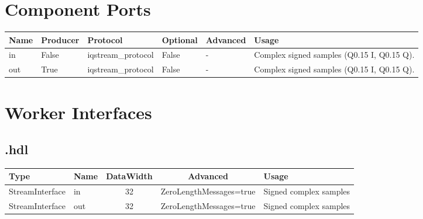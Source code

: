 \begin{landscape}
	\section*{Component Ports}
	\begin{scriptsize}
		\begin{tabular}{|p{2cm}|p{1.5cm}|p{4cm}|p{1.5cm}|p{1.5cm}|p{10.75cm}|}
			\hline
			\rowcolor{blue}
			Name & Producer & Protocol           & Optional & Advanced & Usage                  \\
			\hline
			in   & False    & iqstream\_protocol & False     & -        & Complex signed samples (Q0.15 I, Q0.15 Q). \\
			\hline
			out  & True    & iqstream\_protocol & False     & -        & Complex signed samples (Q0.15 I, Q0.15 Q). \\
			\hline
		\end{tabular}
	\end{scriptsize}

	\section*{Worker Interfaces}
	\subsection*{\comp.hdl}
	\begin{scriptsize}
		\begin{tabular}{|M{2cm}|M{1.5cm}|c|c|M{12cm}|}
			\hline
			\rowcolor{blue}
			Type            & Name & DataWidth & Advanced                & Usage                  \\
			\hline
			StreamInterface & in   & 32        & ZeroLengthMessages=true & Signed complex samples \\
			\hline
			StreamInterface & out  & 32        & ZeroLengthMessages=true & Signed complex samples \\
			\hline
		\end{tabular}
	\end{scriptsize}

	

\end{landscape}

